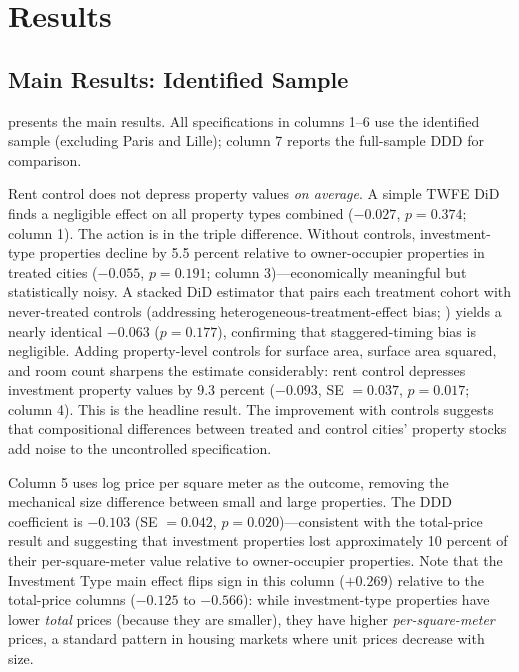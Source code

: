 \documentclass[12pt]{article}
\begin{document}
\section{Results}

\subsection{Main Results: Identified Sample}

 presents the main results. All specifications in columns 1--6 use the identified sample (excluding Paris and Lille); column 7 reports the full-sample DDD for comparison.

Rent control does not depress property values \emph{on average}. A simple TWFE DiD finds a negligible effect on all property types combined ($-0.027$, $p = 0.374$; column 1). The action is in the triple difference. Without controls, investment-type properties decline by 5.5 percent relative to owner-occupier properties in treated cities ($-0.055$, $p = 0.191$; column 3)---economically meaningful but statistically noisy. A stacked DiD estimator that pairs each treatment cohort with never-treated controls (addressing heterogeneous-treatment-effect bias; \citealt{goodmanbacon2021}) yields a nearly identical $-0.063$ ($p = 0.177$), confirming that staggered-timing bias is negligible. Adding property-level controls for surface area, surface area squared, and room count sharpens the estimate considerably: rent control depresses investment property values by 9.3 percent ($-0.093$, SE $= 0.037$, $p = 0.017$; column 4). This is the headline result. The improvement with controls suggests that compositional differences between treated and control cities' property stocks add noise to the uncontrolled specification.

Column 5 uses log price per square meter as the outcome, removing the mechanical size difference between small and large properties. The DDD coefficient is $-0.103$ (SE $= 0.042$, $p = 0.020$)---consistent with the total-price result and suggesting that investment properties lost approximately 10 percent of their per-square-meter value relative to owner-occupier properties. Note that the Investment Type main effect flips sign in this column ($+0.269$) relative to the total-price columns ($-0.125$ to $-0.566$): while investment-type properties have lower \emph{total} prices (because they are smaller), they have higher \emph{per-square-meter} prices, a standard pattern in housing markets where unit prices decrease with size.
\end{document}

